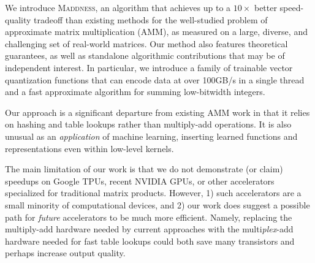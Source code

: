 \documentclass{article}  %
\newcommand{\ours}{\textsc{Maddness}}
\begin{document}

We introduce \ours, an algorithm that achieves up to a $10\times$ better speed-quality tradeoff than existing methods for the well-studied problem of approximate matrix multiplication (AMM), as measured on a large, diverse, and challenging set of real-world matrices.
Our method also features theoretical guarantees, as well as standalone algorithmic contributions that may be of independent interest. In particular, we introduce a family of trainable vector quantization functions that can encode data at over 100GB/s in a single thread and a fast approximate algorithm for summing low-bitwidth integers.

Our approach is a significant departure from existing AMM work in that it relies on hashing and table lookups rather than multiply-add operations. It is also unusual as an \textit{application} of machine learning, inserting learned functions and representations even within low-level kernels.



The main limitation of our work is that we do not demonstrate (or claim) speedups on Google TPUs, recent NVIDIA GPUs, or other accelerators specialized for traditional matrix products. However, 1) such accelerators are a small minority of computational devices, and 2) our work does suggest a possible path for \textit{future} accelerators to be much more efficient. Namely, replacing the multiply-add hardware needed by current approaches with the multi\textit{plex}-add hardware needed for fast table lookups could both save many transistors and perhaps increase output quality.
\end{document}
